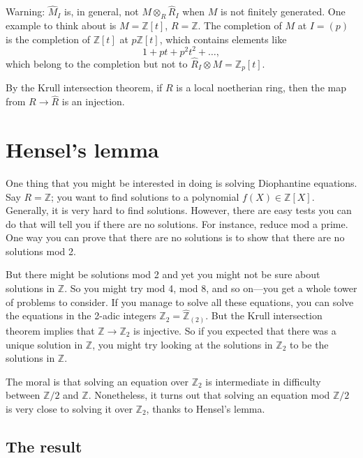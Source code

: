 \begin{remark} 
Warning: $\hat{M}_I$ is, in general, not $M \otimes_R \hat{R}_I$ when $M$ is
not finitely generated. One example to think about is $M  = \mathbb{Z}[t]$,
$R = \mathbb{Z}$. The
completion of $M$ at $I = (p)$ is the completion of $\mathbb{Z}[t]$ at $p
\mathbb{Z}[t]$, which contains elements like
\[ 1 + pt + p^2 t^2 + \dots,  \]
which belong to the completion but not to $\hat{R}_I \otimes M = \mathbb{Z}_p
[t]$. 
\end{remark} 

\begin{remark} 
By the Krull intersection theorem, if $R$ is a local noetherian ring, then the
map from $R \to \hat{R}$ is an injection.
\end{remark} 


\section{Hensel's lemma} One thing that you might be interested in doing is solving
Diophantine equations. Say $R = \mathbb{Z}$; you want to find solutions to a
polynomial $f(X) \in \mathbb{Z}[X]$. Generally, it is very hard to find
solutions. However, there are easy tests you can do that will tell you if there
are no solutions. For instance, reduce mod a prime. One way you can prove that
there are no solutions is to show that there are no solutions mod 2. 

But there might be solutions mod 2 and yet you might not be sure about
solutions in $\mathbb{Z}$. So you might try mod 4, mod 8, and so on---you get a
whole tower of problems to consider. If you manage to solve all these equations, you can solve the equations in the 2-adic integers $\mathbb{Z}_2 =
\hat{\mathbb{Z}}_{(2)}$.
But the Krull intersection theorem implies that $\mathbb{Z} \to \mathbb{Z}_2$
is injective. So if you expected that there was a unique solution in
$\mathbb{Z}$, you might try looking at the solutions in $\mathbb{Z}_2$ to be
the solutions in $\mathbb{Z}$.



The moral is that solving an equation over $\mathbb{Z}_2$ is intermediate in
difficulty between $\mathbb{Z}/2$ and $\mathbb{Z}$. Nonetheless, it turns out
that solving an equation mod $\mathbb{Z}/2$ is very close to solving it over
$\mathbb{Z}_2$, thanks to Hensel's lemma.

\subsection{The result}

